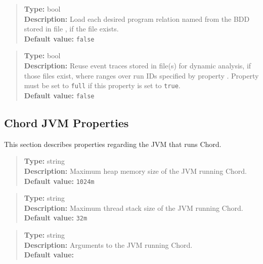 \begin{quote}
{\bf Type:} bool  \\
{\bf Description:} Load each desired program relation named  from the BDD stored in file , if the file exists. \\
{\bf Default value:} {\tt false}
\end{quote}

\begin{quote}
{\bf Type:} bool \\
{\bf Description:} Reuse event traces stored in file(s) \code{chord.trace.file]_full_ver0_runM.txt} for dynamic analysis, if those files exist,
where  ranges over run IDs specified by property .
Property  must be set to {\tt full} if this property is set to {\tt true}. \\
{\bf Default value:} {\tt false}
\end{quote}

\subsection{Chord JVM Properties}
\label{sec:jvm-props}

This section describes properties regarding the JVM that runs Chord.
\\[10pt]

\begin{quote}
{\bf Type:} string \\
{\bf Description:} Maximum heap memory size of the JVM running Chord. \\
{\bf Default value:} {\tt 1024m}
\end{quote}

\begin{quote}
{\bf Type:} string \\
{\bf Description:} Maximum thread stack size of the JVM running Chord. \\
{\bf Default value:} {\tt 32m}
\end{quote}

\begin{quote}
{\bf Type:} string \\
{\bf Description:} Arguments to the JVM running Chord. \\
{\bf Default value:}    
\end{quote}

